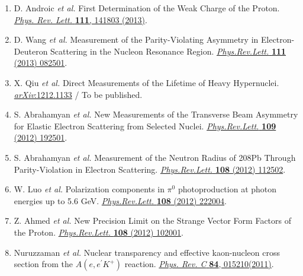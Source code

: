 \begin{singlespace}
\begin{changemargin}{-10pt}{0in}
\begin{enumerate}
	\item D. Androic \textit{et al.}
	First Determination of the Weak Charge of the Proton.
	\href{http://prl.aps.org/abstract/PRL/v111/i14/e141803}{\textit{Phys. Rev. Lett.} \textbf{111}, 141803 (2013)}. %

	\item D. Wang \textit{et al.}
	Measurement of the Parity-Violating Asymmetry in Electron-Deuteron Scattering in the Nucleon Resonance Region.
	\href{http://prl.aps.org/abstract/PRL/v111/i8/e082501}{\textit{Phys.Rev.Lett.} \textbf{111} (2013) 082501}. %
		
	\item X. Qiu \textit{et al.}
	Direct Measurements of the Lifetime of Heavy Hypernuclei.
	\href{http://arxiv.org/abs/1212.1133}{\textit{arXiv}:1212.1133}  / To be published.

	\item S. Abrahamyan \textit{et al.}
	New Measurements of the Transverse Beam Asymmetry for Elastic Electron Scattering from Selected Nuclei.
	\href{http://prl.aps.org/abstract/PRL/v109/i19/e192501}{\textit{Phys.Rev.Lett.} \textbf{109} (2012) 192501}. %

	\item S. Abrahamyan \textit{et al.}
	Measurement of the Neutron Radius of 208Pb Through Parity-Violation in Electron Scattering.
	\href{http://prl.aps.org/abstract/PRL/v108/i11/e112502}{\textit{Phys.Rev.Lett.} \textbf{108} (2012) 112502}. %
	
	\item W. Luo \textit{et al.} 
	Polarization components in $\pi^0$ photoproduction at photon energies up to 5.6 GeV.
	\href{http://prl.aps.org/abstract/PRL/v108/i22/e222004}{\textit{Phys.Rev.Lett.} \textbf{108} (2012) 222004}. %
		
	\item Z. Ahmed \textit{et al.}
	New Precision Limit on the Strange Vector Form Factors of the Proton.
	\href{http://prl.aps.org/abstract/PRL/v108/i10/e102001}{\textit{Phys.Rev.Lett.} \textbf{108} (2012) 102001}. %

	\item Nuruzzaman \textit{et al.} 
	Nuclear transparency and effective kaon-nucleon cross section from the $A(e,e^\prime K^{+})$ reaction.
	\href{http://prc.aps.org/abstract/PRC/v84/i1/e015210}{\textit{Phys. Rev. C} \textbf{84}, 015210(2011)}. %


\end{enumerate}
\end{changemargin}
\end{singlespace}
